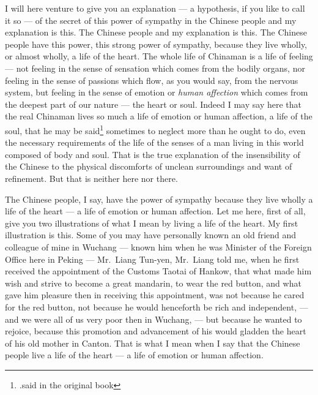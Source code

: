 I will here venture to give you an explanation --- a hypothesis, if you like to call it so --- of the secret of this power of sympathy in the Chinese people and my explanation is this.
The Chinese people and my explanation is this.
The Chinese people have this power, this strong power of sympathy, because they live wholly, or almost wholly, a life of the heart.
The whole life of Chinaman is a life of feeling --- not feeling in the sense of sensation which comes from the bodily organs, nor feeling in the sense of passions which flow, as you would say, from the nervous system, but feeling in the sense of emotion or \emph{human affection} which comes from the deepest part of our nature --- the heart or soul.
Indeed I may say here that the real Chinaman lives so much a life of emotion or human affection, a life of the soul, that he may be said\footnote{.said in the original book} sometimes to neglect more than he ought to do, even the necessary requirements of the life of the senses of a man living in this world composed of body and soul.
That is the true explanation of the insensibility of the Chinese to the physical discomforts of unclean surroundings and want of refinement.
But that is neither here nor there.

The Chinese people, I say, have the power of sympathy because they live wholly a life of the heart --- a life of emotion or human affection.
Let me here, first of all, give you two illustrations of what I mean by living a life of the heart.
My first illustration is this.
Some of you may have personally known an old friend and colleague of mine in Wuchang --- known him when he was Minister of the Foreign Office here in Peking --- Mr.~Liang Tun-yen, Mr.~Liang told me, when he first received the appointment of the Customs Taotai of Hankow, that what made him wish and strive to become a great mandarin, to wear the red button, and what gave him pleasure then in receiving this appointment, was not because he cared for the red button, not because he would henceforth be rich and independent, --- and we were all of us very poor then in Wuchang, --- but because he wanted to rejoice, because this promotion and advancement of his would gladden the heart of his old mother in Canton.
That is what I mean when I say that the Chinese people live a life of the heart --- a life of emotion or human affection.

